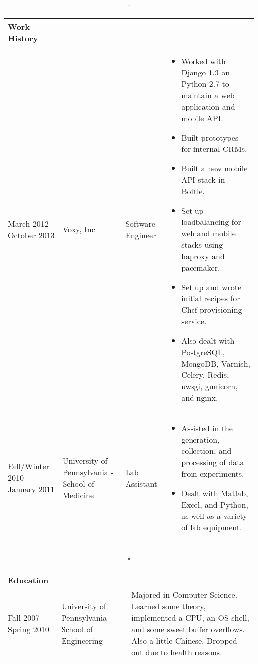 \documentclass[a4paper]{article}
\begin{document}
    \vspace{.2in}
    \begin{longtable}{ m{3cm} m{3cm} m{3cm} m{8cm}}
        \caption*{Work History}\\
        \hline
        March 2012 - \newline October 2013 & Voxy, Inc & Software Engineer & 
            \begin{itemize}
                \item Worked with Django 1.3 on Python 2.7 to maintain a web application and mobile API.
                \item Built prototypes for internal CRMs.
                \item Built a new mobile API stack in Bottle.
                \item Set up loadbalancing for web and mobile stacks using haproxy and pacemaker.
                \item Set up and wrote initial recipes for Chef provisioning service.
                \item Also dealt with PostgreSQL, MongoDB, Varnish, Celery, Redis, uwsgi, gunicorn, and nginx. 
            \end{itemize}
        \\
        \hline
        Fall/Winter 2010 - January 2011 & University of \newline Pennsylvania - \newline School of Medicine & Lab Assistant & 
            \begin{itemize}
                \item Assisted in the generation, collection, and processing of data from experiments. 
                \item Dealt with Matlab, Excel, and Python, as well as a variety of lab equipment.
            \end{itemize}
        \\
        \hline
        \par
    \end{longtable}

    \vspace{.2in}

    \begin{longtable}{ m{3cm} m{6.45cm} m{8cm} }
        \caption*{Education}\\
        \hline
        Fall 2007 - \newline Spring 2010 & University of \newline Pennsylvania - \newline School of Engineering & Majored in Computer Science. Learned some theory, implemented a CPU, an OS shell, and some sweet buffer overflows. Also a little Chinese. Dropped out due to health reasons. \\
    \end{longtable}
    
\end{document}
